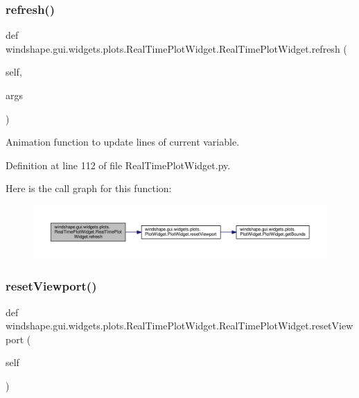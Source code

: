 \subsubsection{\texorpdfstring{refresh()}{refresh()}}
{\footnotesize\ttfamily def windshape.\+gui.\+widgets.\+plots.\+Real\+Time\+Plot\+Widget.\+Real\+Time\+Plot\+Widget.\+refresh (\begin{DoxyParamCaption}\item[{}]{self,  }\item[{}]{args }\end{DoxyParamCaption})}

\begin{DoxyVerb}Animation function to update lines of current variable.\end{DoxyVerb}
 

Definition at line 112 of file Real\+Time\+Plot\+Widget.\+py.

Here is the call graph for this function\+:\nopagebreak
\begin{figure}[H]
\begin{center}
\leavevmode
\includegraphics[width=350pt]{classwindshape_1_1gui_1_1widgets_1_1plots_1_1_real_time_plot_widget_1_1_real_time_plot_widget_a6da1feb72934f37c992998e8367a3dd7_cgraph}
\end{center}
\end{figure}
\mbox{\label{classwindshape_1_1gui_1_1widgets_1_1plots_1_1_real_time_plot_widget_1_1_real_time_plot_widget_ab10e24b676c557fba831c0eec65c104c}} 
\subsubsection{\texorpdfstring{reset\+Viewport()}{resetViewport()}}
{\footnotesize\ttfamily def windshape.\+gui.\+widgets.\+plots.\+Real\+Time\+Plot\+Widget.\+Real\+Time\+Plot\+Widget.\+reset\+Viewport (\begin{DoxyParamCaption}\item[{}]{self }\end{DoxyParamCaption})}

